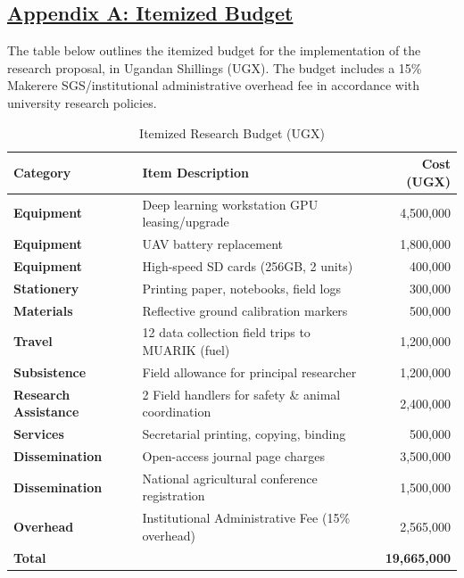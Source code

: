 \documentclass[12pt]{article}
\begin{document}
\subsection*{\underline{\textbf{Appendix A: Itemized Budget}}}
The table below outlines the itemized budget for the implementation of the research proposal, in Ugandan Shillings (UGX). The budget includes a 15\% Makerere SGS/institutional administrative overhead fee in accordance with university research policies.

\begin{table}[h]
\centering
\caption{Itemized Research Budget (UGX)}
\label{tab:budget}
\begin{tabular}{llr}
    \toprule
    \textbf{Category} & \textbf{Item Description} & \textbf{Cost (UGX)} \\
    \midrule
    \textbf{Equipment} & Deep learning workstation GPU leasing/upgrade & 4,500,000 \\
    \textbf{Equipment} & UAV battery replacement & 1,800,000 \\
    \textbf{Equipment} & High-speed SD cards (256GB, 2 units) & 400,000 \\
    \textbf{Stationery} & Printing paper, notebooks, field logs & 300,000 \\
    \textbf{Materials} & Reflective ground calibration markers & 500,000 \\
    \textbf{Travel} & 12 data collection field trips to MUARIK (fuel) & 1,200,000 \\
    \textbf{Subsistence} & Field allowance for principal researcher & 1,200,000 \\
    \textbf{Research Assistance} & 2 Field handlers for safety \& animal coordination & 2,400,000 \\
    \textbf{Services} & Secretarial printing, copying, binding & 500,000 \\
    \textbf{Dissemination} & Open-access journal page charges & 3,500,000 \\
    \textbf{Dissemination} & National agricultural conference registration & 1,500,000 \\
    \textbf{Overhead} & Institutional Administrative Fee (15\% overhead) & 2,565,000 \\
    \textbf{Total} & & \textbf{19,665,000} \\
    \bottomrule
\end{tabular}
\end{table}
\end{document}
